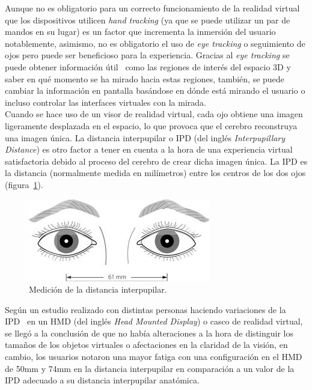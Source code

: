 Aunque no es obligatorio para un correcto funcionamiento de la realidad virtual que los dispositivos utilicen \textit{hand tracking} (ya que se puede utilizar un par de mandos en su lugar) es un factor que incrementa la inmersión del usuario notablemente, asimismo, no es obligatorio el uso de \textit{eye tracking} o seguimiento de ojos pero puede ser beneficioso para la experiencia. Gracias al \textit{eye tracking} se puede obtener información útil~\cite{eyetrackingVR} como las regiones de interés del espacio 3D y saber en qué momento se ha mirado hacia estas regiones, también, se puede cambiar la información en pantalla basándose en dónde está mirando el usuario o incluso controlar las interfaces virtuales con la mirada.\\


Cuando se hace uso de un visor de realidad virtual, cada ojo obtiene una imagen ligeramente desplazada en el espacio, lo que provoca que el cerebro reconstruya una imagen única. La distancia interpupilar o IPD (del inglés \textit{Interpupillary Distance}) es otro factor a tener en cuenta a la hora de una experiencia virtual satisfactoria debido al proceso del cerebro de crear dicha imagen única. La IPD es la distancia (normalmente medida en milímetros) entre los centros de los dos ojos (figura~\ref{fig:IPDExample}).

\begin{figure}[H]
    \centering
    \includegraphics[scale=1]{Images/Estado del arte/IPD.jpg}
    \caption[Medición de la distancia interpupilar]{Medición de la distancia interpupilar\footnotemark.}
    \label{fig:IPDExample}
\end{figure}

Según un estudio realizado con distintas personas haciendo variaciones de la IPD~\cite{IPDTest} en un HMD (del inglés \textit{Head Mounted Display}) o casco de realidad virtual, se llegó a la conclusión de que no había alteraciones a la hora de distinguir los tamaños de los objetos virtuales o afectaciones en la claridad de la visión, en cambio, los usuarios notaron una mayor fatiga con una configuración en el HMD de 50mm y 74mm en la distancia interpupilar en comparación a un valor de la IPD adecuado a su distancia interpupilar anatómica.\\

